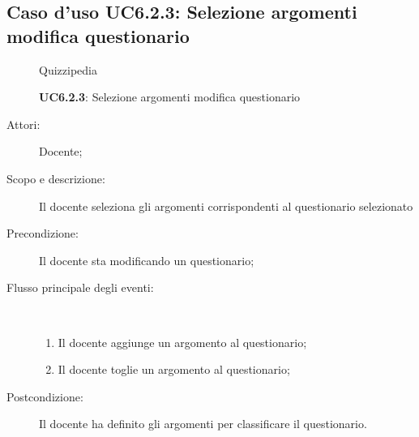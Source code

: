 \subsection{Caso d'uso UC6.2.3: Selezione argomenti modifica questionario}
	\begin{figure}[H]
		\centering
		\begin{resizedtikzpicture}{\textwidth}
		\begin{umlsystem}[x=0, fill=lightgray!20]{Quizzipedia}
		\end{umlsystem}
		\end{resizedtikzpicture}
		\caption{\textbf{UC6.2.3}: Selezione argomenti modifica questionario}
		\label{UC6.2.3}
	\end{figure}
\begin{description}
\item[Attori:] Docente;
\item[Scopo e descrizione:] Il docente seleziona gli argomenti corrispondenti al questionario selezionato
      \item[Precondizione:] Il docente sta modificando un questionario;

        \item[Flusso principale degli eventi:] \ 
 \begin{enumerate}
          \item Il docente aggiunge un argomento al questionario;
          \item Il docente toglie un argomento al questionario;

      \end{enumerate}
    \item[Postcondizione:] Il docente ha definito gli argomenti per classificare il questionario.
  \end{description}
\hypertarget{UC6.3}{}
